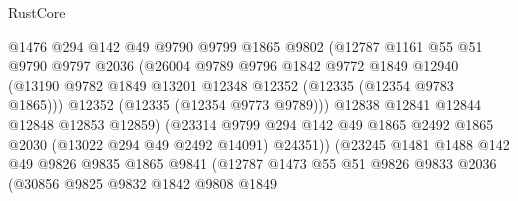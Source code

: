 \begin{lexlean}{RustCore}
\begin{coremodule}
                            @1476
                            @294
                            @142
                            @49
                            @9790
                            @9799
                            @1865
                            @9802
                            (@12787
                              @1161
                              @55
                              @51
                              @9790
                              @9797
                              @2036
                              (@26004
                                @9789
                                @9796
                                @1842
                                @9772
                                @1849
                                @12940
                                (@13190
                                  @9782
                                  @1849
                                  @13201
                                  @12348
                                  @12352
                                  (@12335 (@12354 @9783 @1865)))
                                @12352
                                (@12335 (@12354 @9773 @9789)))
                              @12838
                              @12841
                              @12844
                              @12848
                              @12853
                              @12859)
                            (@23314
                              @9799
                              @294
                              @142
                              @49
                              @1865
                              @2492
                              @1865
                              @2030
                              (@13022 @294 @49 @2492 @14091)
                              @24351))
                          (@23245
                            @1481
                            @1488
                            @142
                            @49
                            @9826
                            @9835
                            @1865
                            @9841
                            (@12787
                              @1473
                              @55
                              @51
                              @9826
                              @9833
                              @2036
                              (@30856
                                @9825
                                @9832
                                @1842
                                @9808
                                @1849

\end{coremodule}
\end{lexlean}
